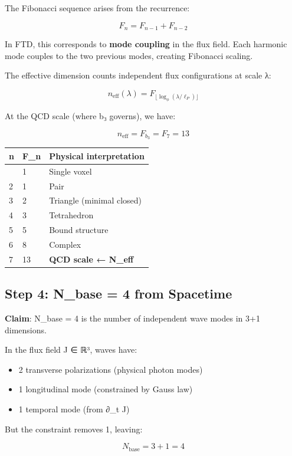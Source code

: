 \documentclass[
  11pt,
  letterpaper,
  twoside,
  openright]{book}
\providecommand{\tightlist}{%
  \setlength{\itemsep}{0pt}\setlength{\parskip}{0pt}}
\begin{document}
The Fibonacci sequence arises from the recurrence:

\[F_n = F_{n-1} + F_{n-2}\]

In FTD, this corresponds to \textbf{mode coupling} in the flux field.
Each harmonic mode couples to the two previous modes, creating Fibonacci
scaling.

The effective dimension counts independent flux configurations at scale
λ:

\[n_{\text{eff}}(\lambda) = F_{\lfloor \log_\phi(\lambda/\ell_P) \rfloor}\]

At the QCD scale (where b₃ governs), we have:

\[n_{\text{eff}} = F_{b_3} = F_7 = 13\]

\begin{longtable}[]{@{}lll@{}}
\toprule\noalign{}
n & F\_n & Physical interpretation \\
\midrule\noalign{}
\endhead
\bottomrule\noalign{}
\endlastfoot
1 & 1 & Single voxel \\
2 & 1 & Pair \\
3 & 2 & Triangle (minimal closed) \\
4 & 3 & Tetrahedron \\
5 & 5 & Bound structure \\
6 & 8 & Complex \\
7 & 13 & \textbf{QCD scale ← N\_eff} \\
\end{longtable}

\subsection{Step 4: N\_base = 4 from
Spacetime}\label{step-4-n_base-4-from-spacetime}

\textbf{Claim}: N\_base = 4 is the number of independent wave modes in
3+1 dimensions.

In the flux field J ∈ ℝ³, waves have:

\begin{itemize}
\tightlist
\item
  2 transverse polarizations (physical photon modes)
\item
  1 longitudinal mode (constrained by Gauss law)
\item
  1 temporal mode (from ∂\_t J)
\end{itemize}

But the constraint removes 1, leaving:

\[N_{\text{base}} = 3 + 1 = 4\]
\end{document}
